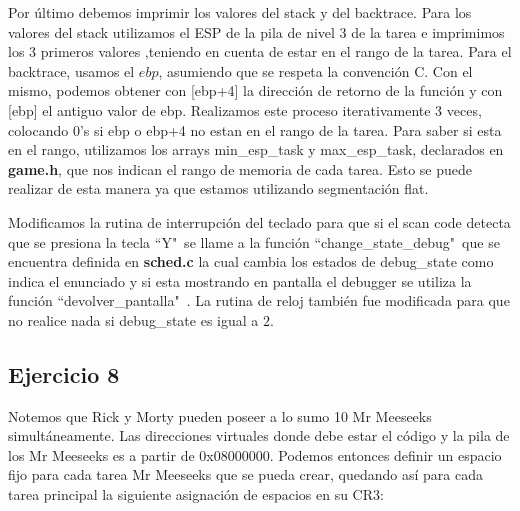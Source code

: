 \documentclass[a4paper]{article}
\begin{document}
\justify
Por último debemos imprimir los valores del stack y del backtrace. Para los valores del stack utilizamos el ESP de la pila de nivel $3$ de la tarea e imprimimos los $3$ primeros valores ,teniendo en cuenta de estar en el rango de la tarea. Para el backtrace, usamos el $ebp$, asumiendo que se respeta la convención C. Con el mismo, podemos obtener con [ebp+4] la dirección de retorno de la función y con [ebp] el antiguo valor de ebp. Realizamos este proceso iterativamente 3 veces, colocando 0's si ebp o ebp+4 no estan en el rango de la tarea. Para saber si esta en el rango, utilizamos los arrays min_esp_task y max_esp_task, declarados en \textbf{game.h}, que nos indican el rango de memoria de cada tarea. Esto se puede realizar de esta manera ya que estamos utilizando segmentación flat.


\justify
Modificamos la rutina de interrupción del teclado para que si el scan code detecta que se presiona la tecla ``Y"\ se llame a la función ``change_state_debug"\ que se encuentra definida en \textbf{sched.c} la cual cambia los estados de debug_state como indica el enunciado y si esta mostrando en pantalla el debugger se utiliza la función ``devolver_pantalla"\ . La rutina de reloj también fue modificada para que no realice nada si debug_state es igual a $2$.


\subsection{Ejercicio 8}
\justify
Notemos que Rick y Morty pueden poseer a lo sumo 10 Mr Meeseeks simultáneamente. Las direcciones virtuales donde debe estar el código y la pila de los Mr Meeseeks es a partir de 0x08000000. Podemos entonces definir un espacio fijo para cada tarea Mr Meeseeks que se pueda crear, quedando así para cada tarea principal la siguiente asignación de espacios en su CR3:
\end{document}
